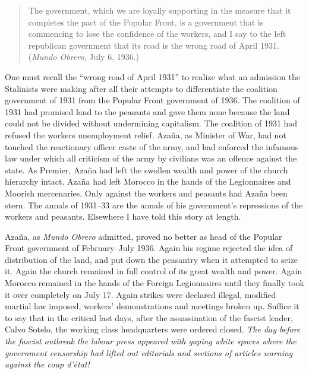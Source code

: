 \begin{quotation}
  The government, which we are loyally supporting in the measure that it completes the pact of the Popular Front, is a government that is commencing to lose the confidence of the workers, and I say to the left republican government that its road is the wrong road of April 1931. (\emph{Mundo Obrero}{\indexMundoObrero}, July 6, 1936.)
\end{quotation}

One must recall the ``wrong road of April 1931'' to realize what an admission the Stalinists were making after all their attempts to differentiate the coalition government of 1931 from the Popular Front government of 1936. The coalition of 1931 had promised land to the peasants and gave them none because the land could not be divided without undermining capitalism. The coalition of 1931 had refused the workers unemployment relief. Azaña, as Minister of War, had not touched the reactionary officer caste of the army, and had enforced the infamous law under which all criticism of the army by civilians was an offence against the state. As Premier, Azaña had left the swollen wealth and power of the church hierarchy intact. Azaña had left Morocco in the hands of the Legionnaires and Moorish mercenaries. Only against the workers and peasants had Azaña been stern. The annals of 1931--33 are the annals of his government’s repressions of the workers and peasants. Elsewhere\label{en:CivilWarReference} I have told this story at length.

Azaña, as \emph{Mundo Obrero} admitted, proved no better as head of the Popular Front government of February--July 1936. Again his regime rejected the idea of distribution of the land, and put down the peasantry when it attempted to seize it. Again the church remained in full control of its great wealth and power. Again Morocco remained in the hands of the Foreign Legionnaires until they finally took it over completely on July 17. Again strikes were declared illegal, modified martial law imposed, workers’ demonstrations and meetings broken up. Suffice it to say that in the critical last days, after the assassination of the fascist leader, Calvo Sotelo, the working class headquarters were ordered closed. \emph{The day before the fascist outbreak the labour press appeared with gaping white spaces where the government censorship had lifted out editorials and sections of articles warning against the \emph{coup d’\'etat}!}

